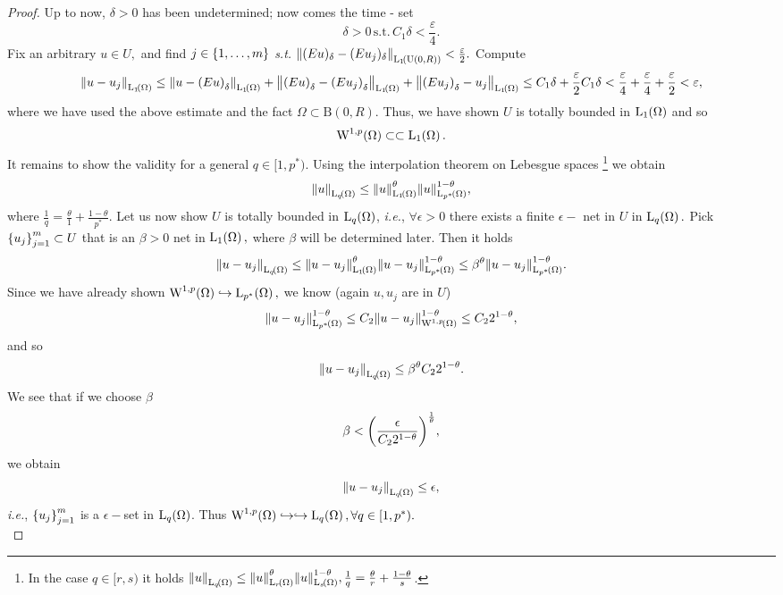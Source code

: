 \documentclass{article}
\begin{document}
\begin{proof}
	Up to now, $\delta >0$ has been undetermined; now comes the time -  set
	\[
		\delta >0 \, \text{s.t.} \, C_1 \delta < \frac{\varepsilon}{4}.
	\]
	Fix an arbitrary $u \in U,$ and find $j \in \qty{1,\dots,m}$ \textit{s.t.} $\norm{(Eu)_{\delta}-(Eu_j)_{\delta}}_{\LpSet[1]{\text{U}(0,R)}} < \frac{\varepsilon}{2}.$ Compute
	\[
		\norm{u-u_j}_{\LpSet[1]{\Omega}} \leq \norm{u-\qty(Eu)_{\delta}}_{\LpSet[1]{\Omega}} + \norm{\qty(Eu)_{\delta}-\qty(Eu_j)_{\delta}}_{\LpSet[1]{\Omega}}+ \norm{\qty(Eu_j)_{\delta}-u_j}_{\LpSet[1]{\Omega}}\leq C_1 \delta + \frac{\varepsilon}{2} C_1 \delta < \frac{\varepsilon}{4} + \frac{\varepsilon}{4} + \frac{\varepsilon}{2} < \varepsilon,
	\]
	where we have used the above estimate and the fact $\Omega \subset \text{B}(0,R).$
	Thus, we have shown $U$ is totally bounded in $\LpSet[1]{\Omega}$ and so
	\[
		\WkpSet[1][p]{\Omega} \subset \subset \LpSet[1]{\Omega}.
	\]
	It remains to show the validity for a general $q \in [1,p^{*})$. Using the interpolation theorem on Lebesgue spaces \footnote{In the case $q \in [r,s)$ it holds $\norm{u}_{\LpSet[q]{\Omega}} \leq \norm{u}_{\LpSet[r]{\Omega}}^{\theta}\norm{u}_{\LpSet[s]{\Omega}}^{1-\theta}, \frac{1}{q} = \frac{\theta}{r} + \frac{1-\theta}{s}$.} we obtain
	\[
		\norm{u}_{\LpSet[q]{\Omega}} \leq \norm{u}_{\LpSet[1]{\Omega}}^{\theta}\norm{u}_{\LpSet[p^{*}]{\Omega}}^{1-\theta},
	\]
	where $\frac{1}{q} = \frac{\theta}{1} + \frac{1-\theta}{p^{*}}.$  Let us now show $U$ is totally bounded in $\LpSet[q]{\Omega}$, \textit{i.e.}, $\forall \epsilon >0$ there exists a finite $\epsilon-$ net in $U$ in $\LpSet[q]{\Omega}.$ Pick $\qty{u_j}_{j=1}^m \subset U$ that is an $\beta >0$ net in $\LpSet[1]{\Omega},$ where $\beta$ will be determined later. Then it holds
	\[
		\norm{u-u_j}_{\LpSet[q]{\Omega}}\leq \norm{u-u_j}_{\LpSet[1]{\Omega}}^\theta \norm{u-u_j}_{\LpSet[p^{*}]{\Omega}}^{1-\theta} \leq  \beta^\theta \norm{u- u_j}_{\LpSet[p^{*}]{\Omega}}^{1-\theta}.
	\]
	Since we have already shown $\WkpSet[1][p]{\Omega} \hookrightarrow \LpSet[p^{*}]{\Omega},$ we know (again $u, u_j$ are in $U$)
	\[
		\norm{u-u_j}_{\LpSet[p^{*}]{\Omega}}^{1-\theta} \leq C_2 \norm{u - u_j}_{\WkpSet[1][p]{\Omega}}^{1-\theta} \leq C_2 2^{1-\theta},
	\]
	and so
	\[
		\norm{u-u_j}_{\LpSet[q]{\Omega}} \leq \beta^{\theta}C_2 2^{1-\theta}.
	\]
	We see that if we choose $\beta$ \, \,
	\[
		\beta < \qty(\frac{\epsilon}{C_2 2^{1-\theta}})^{\frac{1}{\theta}},
	\]
	we obtain
	\[
		\norm{u - u_j}_{\LpSet[q]{\Omega}} \leq \epsilon,
	\]
	\textit{i.e.}, $\qty{u_j}_{j=1}^m$ is a $\epsilon-$set in $\LpSet[q]{\Omega}$. Thus $\WkpSet[1][p]{\Omega} \hookrightarrow \hookrightarrow \LpSet[q]{\Omega}, \forall q \in [1, p^{*}).$ \\


\end{proof}
\end{document}
